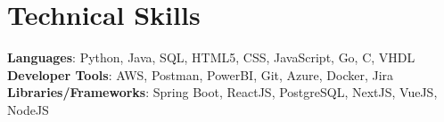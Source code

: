 \documentclass[letterpaper,11pt]{article}
\begin{document}
\section{Technical Skills}
 \begin{itemize}[leftmargin=0.05in, label={}] %
    \small{\item{   
     \textbf{Languages}{: Python, Java, SQL, HTML5, CSS, JavaScript, Go, C, VHDL} \\[1mm]
     \textbf{Developer Tools}{: AWS, Postman, PowerBI, Git, Azure, Docker, Jira} \\[1mm]
     \textbf{Libraries/Frameworks}{: Spring Boot, ReactJS, PostgreSQL, NextJS, VueJS, NodeJS} \\ [1mm]
    }}
 \end{itemize}
 \vspace{-16pt}
 \vspace{3pt}
\vspace{10pt}

\vspace{-15pt}
\end{document}
